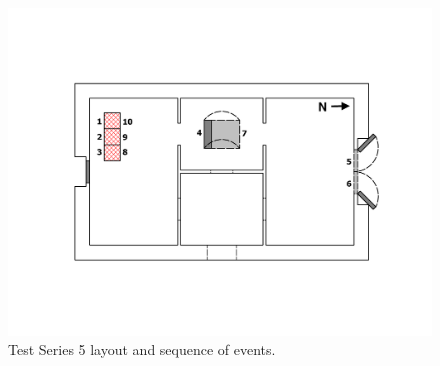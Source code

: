 \documentclass[12pt,oneside]{book}
\begin{document}
\begin{figure}[!ht]
\begin{minipage}[b]{0.8\columnwidth}
\begin{flushleft}
	\end{flushleft}
\end{minipage}
\begin{minipage}[b]{0.9\columnwidth}
	\vspace{15pt}
	\centering
	\includegraphics[width=\columnwidth]{../Figures/Floor_Plans/East_Structure_Test_5}
\end{minipage}
\caption{Test Series 5 layout and sequence of events.}
\label{fig:east_test_5}
\end{figure}
\end{document}

